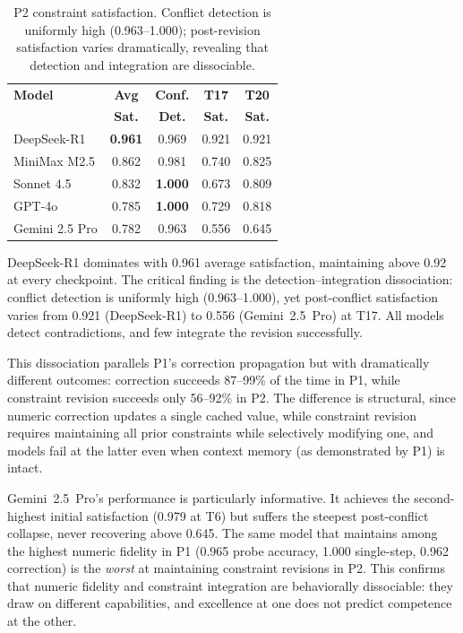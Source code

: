\documentclass[11pt,a4paper]{article}
\begin{document}
\begin{table}[tbp]
\centering
\caption{P2 constraint satisfaction. Conflict detection is uniformly high (0.963--1.000); post-revision satisfaction varies dramatically, revealing that detection and integration are dissociable.}
\label{tab:p2}
\footnotesize
\begin{tabular}{lcccc}
\toprule
\textbf{Model} & \textbf{Avg} & \textbf{Conf.} & \textbf{T17} & \textbf{T20} \\
 & \textbf{Sat.} & \textbf{Det.} & \textbf{Sat.} & \textbf{Sat.} \\
\midrule
DeepSeek-R1     & \textbf{0.961} & 0.969          & 0.921 & 0.921 \\
MiniMax M2.5    & 0.862          & 0.981          & 0.740 & 0.825 \\
Sonnet 4.5      & 0.832          & \textbf{1.000} & 0.673 & 0.809 \\
GPT-4o          & 0.785          & \textbf{1.000} & 0.729 & 0.818 \\
Gemini 2.5 Pro  & 0.782          & 0.963          & 0.556 & 0.645 \\
\bottomrule
\end{tabular}
\end{table}

DeepSeek-R1 dominates with 0.961 average satisfaction, maintaining above 0.92 at every checkpoint. The critical finding is the detection--integration dissociation: conflict detection is uniformly high (0.963--1.000), yet post-conflict satisfaction varies from 0.921 (DeepSeek-R1) to 0.556 (Gemini~2.5~Pro) at T17. All models detect contradictions, and few integrate the revision successfully.

This dissociation parallels P1's correction propagation but with dramatically different outcomes: correction succeeds 87--99\% of the time in P1, while constraint revision succeeds only 56--92\% in P2. The difference is structural, since numeric correction updates a single cached value, while constraint revision requires maintaining all prior constraints while selectively modifying one, and models fail at the latter even when context memory (as demonstrated by P1) is intact.

Gemini~2.5~Pro's performance is particularly informative. It achieves the second-highest initial satisfaction (0.979 at T6) but suffers the steepest post-conflict collapse, never recovering above 0.645. The same model that maintains among the highest numeric fidelity in P1 (0.965 probe accuracy, 1.000 single-step, 0.962 correction) is the \emph{worst} at maintaining constraint revisions in P2. This confirms that numeric fidelity and constraint integration are behaviorally dissociable: they draw on different capabilities, and excellence at one does not predict competence at the other.
\end{document}
